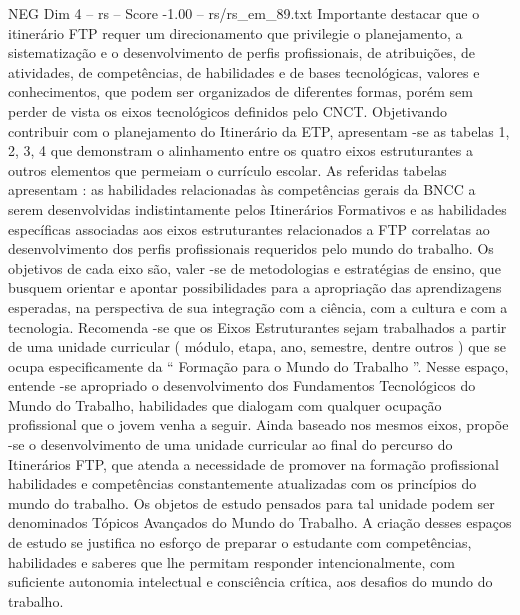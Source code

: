 \begin{textsample}{NEG Dim 4 – rs – Score -1.00 – rs/rs\_em\_89.txt}
Importante destacar que o itinerário FTP requer um direcionamento que privilegie o planejamento, a sistematização e o desenvolvimento de perfis profissionais, de atribuições, de atividades, de competências, de habilidades e de bases tecnológicas, valores e conhecimentos, que podem ser organizados de diferentes formas, porém sem perder de vista os eixos tecnológicos definidos pelo CNCT.
Objetivando contribuir com o planejamento do Itinerário da ETP, apresentam -se as tabelas 1, 2, 3, 4 que demonstram o alinhamento entre os quatro eixos estruturantes a outros elementos que permeiam o currículo escolar.
As referidas tabelas apresentam : as habilidades relacionadas às competências gerais da BNCC a serem desenvolvidas indistintamente pelos Itinerários Formativos e as habilidades específicas associadas aos eixos estruturantes relacionados a FTP correlatas ao desenvolvimento dos perfis profissionais requeridos pelo mundo do trabalho.
Os objetivos de cada eixo são, valer -se de metodologias e estratégias de ensino, que busquem orientar e apontar possibilidades para a apropriação das aprendizagens esperadas, na perspectiva de sua integração com a ciência, com a cultura e com a tecnologia.
Recomenda -se que os Eixos Estruturantes sejam trabalhados a partir de uma unidade curricular ( módulo, etapa, ano, semestre, dentre outros ) que se ocupa especificamente da “ Formação para o Mundo do Trabalho ”.
Nesse espaço, entende -se apropriado o desenvolvimento dos Fundamentos Tecnológicos do Mundo do Trabalho, habilidades que dialogam com qualquer ocupação profissional que o jovem venha a seguir.
Ainda baseado nos mesmos eixos, propõe -se o desenvolvimento de uma unidade curricular ao final do percurso do Itinerários FTP, que atenda a necessidade de promover na formação profissional habilidades e competências constantemente atualizadas com os princípios do mundo do trabalho.
Os objetos de estudo pensados para tal unidade podem ser denominados Tópicos Avançados do Mundo do Trabalho.
A criação desses espaços de estudo se justifica no esforço de preparar o estudante com competências, habilidades e saberes que lhe permitam responder intencionalmente, com suficiente autonomia intelectual e consciência crítica, aos desafios do mundo do trabalho.

\end{textsample}
